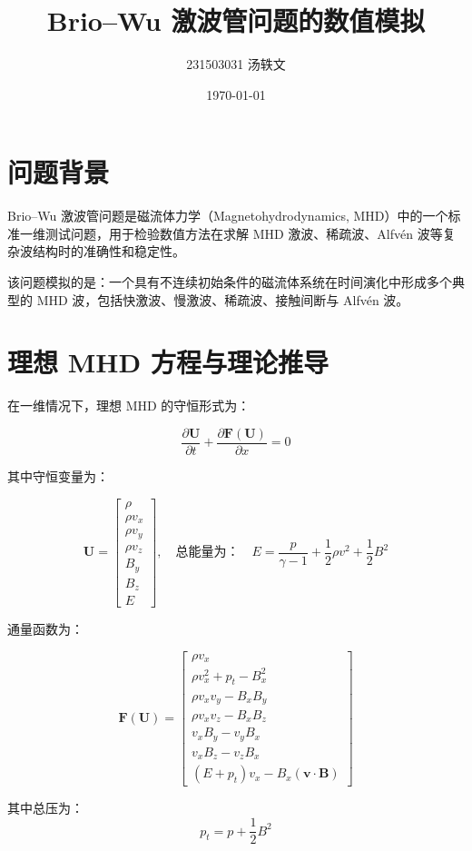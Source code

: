 \documentclass[12pt]{article}
\title{Brio–Wu 激波管问题的数值模拟}
\author{231503031 汤轶文}
\date{\today}
\begin{document}
\maketitle

\section{问题背景}

Brio–Wu 激波管问题是磁流体力学（Magnetohydrodynamics, MHD）中的一个标准一维测试问题，用于检验数值方法在求解 MHD 激波、稀疏波、Alfvén 波等复杂波结构时的准确性和稳定性。

\bigskip
该问题模拟的是：一个具有不连续初始条件的磁流体系统在时间演化中形成多个典型的 MHD 波，包括快激波、慢激波、稀疏波、接触间断与 Alfvén 波。

\section{理想 MHD 方程与理论推导}

在一维情况下，理想 MHD 的守恒形式为：

\[
\frac{\partial \bm{U}}{\partial t} + \frac{\partial \bm{F}(\bm{U})}{\partial x} = 0
\]

其中守恒变量为：

\[
\bm{U} =
\begin{bmatrix}
\rho \\
\rho v_x \\
\rho v_y \\
\rho v_z \\
B_y \\
B_z \\
E
\end{bmatrix}, \quad
\mbox{总能量为：} \quad
E = \frac{p}{\gamma - 1} + \frac{1}{2} \rho v^2 + \frac{1}{2} B^2
\]

通量函数为：

\[
\bm{F}(\bm{U}) =
\begin{bmatrix}
\rho v_x \\
\rho v_x^2 + p_t - B_x^2 \\
\rho v_x v_y - B_x B_y \\
\rho v_x v_z - B_x B_z \\
v_x B_y - v_y B_x \\
v_x B_z - v_z B_x \\
(E + p_t) v_x - B_x(\bm{v} \cdot \bm{B})
\end{bmatrix}
\]

其中总压为：
\[
p_t = p + \frac{1}{2} B^2
\]
\end{document}
